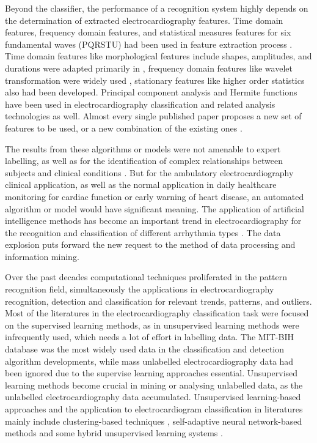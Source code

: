 \documentclass[journal]{IEEEtran}
\begin{document}
 
Beyond the classifier, the performance of a recognition system highly depends on the determination of extracted electrocardiography features. Time domain features, frequency domain features, and statistical measures features for six fundamental waves (PQRSTU) had been used in feature extraction process \cite{chia}. 
Time domain features like morphological features include shapes, amplitudes, and durations were adapted primarily in \cite{jekova, christove, can}, frequency domain features like wavelet transformation were widely used \cite{inan}, \cite{banerjee} stationary features like higher order statistics also had been developed. 
Principal component analysis \cite{stam} and Hermite functions \cite{lager} have been used in electrocardiography classification and related analysis technologies as well.
Almost every single published paper proposes a new set of features to be used, or a new combination of the existing ones \cite{mar}.


The results from these algorithms or models were not amenable to expert labelling, as well as for the identification of complex relationships between subjects and clinical conditions \cite{clifford}.
But for the ambulatory electrocardiography clinical application, as well as the normal application in daily healthcare monitoring for cardiac function or early warning of heart disease, an automated algorithm or model would have significant meaning.
The application of artificial intelligence methods has become an important trend in electrocardiography for the recognition and classification of different arrhythmia types \cite{clifford}. 
The data explosion puts forward the new request to the method of data processing and information mining.


Over the past decades computational techniques proliferated in the pattern recognition field, simultaneously the applications in electrocardiography recognition, detection and classification for relevant trends, patterns, and outliers. 
Most of the literatures in the electrocardiography classification task were focused on the supervised learning methods, as in unsupervised learning methods were infrequently used, which needs a lot of effort in labelling data. The MIT-BIH database \cite{physionet} was the most widely used data in the classification and detection algorithm developments, while mass unlabelled electrocardiography data had been ignored due to the supervise learning approaches essential. 
Unsupervised learning methods become crucial in mining or analysing unlabelled data, as the unlabelled electrocardiography data accumulated. Unsupervised learning-based approaches and the application to electrocardiogram classification in literatures mainly include clustering-based techniques \cite{lager, nishizawa, maier}, self-adaptive neural network-based methods \cite{palreddy, risk} and some hybrid unsupervised learning systems \cite{tadejko}. 
\end{document}
